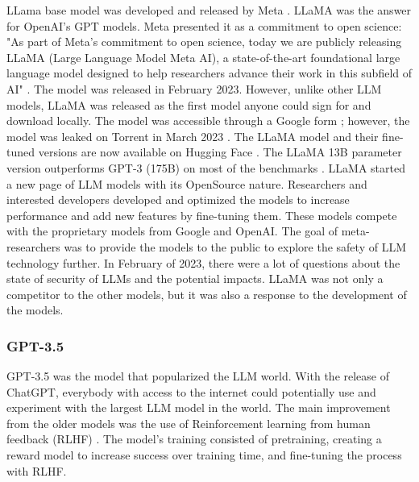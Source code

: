 LLama base model was developed and released by Meta \cite{touvron2023llama}. LLaMA was the answer for OpenAI's GPT models. Meta presented it as a commitment to open science: "As part of Meta’s commitment to open science, today we are publicly releasing LLaMA (Large Language Model Meta AI), a state-of-the-art foundational large language model designed to help researchers advance their work in this subfield of AI" \cite{llamablog}. The model was released in February 2023. However, unlike other LLM models, LLaMA was released as the first model anyone could sign for and download locally. The model was accessible through a Google form \cite{form_2019}; however, the model was leaked on Torrent in March 2023 \cite{andrew_2023}. The LLaMA model and their fine-tuned versions are now available on Hugging Face \cite{llama_2014}. The LLaMA 13B parameter version outperforms GPT-3 (175B) on most of the benchmarks \cite{touvron2023llama}. LLaMA started a new page of LLM models with its OpenSource nature. Researchers and interested developers developed and optimized the models to increase performance and add new features by fine-tuning them. These models compete with the proprietary models from Google and OpenAI. The goal of meta-researchers was to provide the models to the public to explore the safety of LLM technology further. In February of 2023, there were a lot of questions about the state of security of LLMs and the potential impacts. LLaMA was not only a competitor to the other models, but it was also a response to the development of the models.



\subsubsection{GPT-3.5}


GPT-3.5 was the model that popularized the LLM world. With the release of ChatGPT, everybody with access to the internet could potentially use and experiment with the largest LLM model in the world. \cite{ye2023comprehensive} The main improvement from the older models was the use of Reinforcement learning from human feedback (RLHF) \cite{illustrating}. The model's training consisted of pretraining, creating a reward model to increase success over training time, and fine-tuning the process with RLHF.

